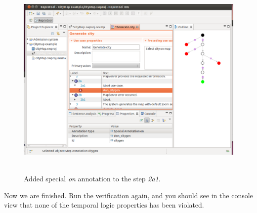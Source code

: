 \begin{figure}[ht]
  \centering
  \includegraphics[height=280pt]{images/reprotoolTraceCityMapFix2}
  \caption{Added special \emph{on} annotation to the step \emph{2a1}.}
  \label{fig:reprotoolTraceCityMapFix2}
\end{figure}

Now we are finished. Run the verification again, and you should see in the console view that none of the temporal logic properties
has been violated.